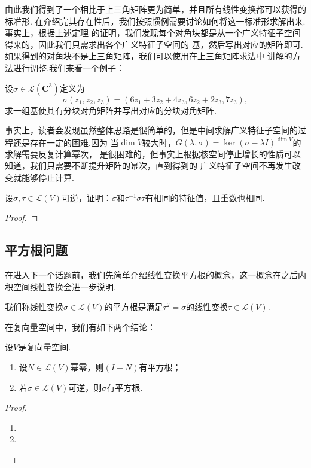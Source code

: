 由此我们得到了一个相比于上三角矩阵更为简单，并且所有线性变换都可以获得的标准形.
在介绍完其存在性后，我们按照惯例需要讨论如何将这一标准形求解出来.事实上，根据上述定理
的证明，我们发现每个对角块都是从一个广义特征子空间得来的，因此我们只需求出各个广义特征子空间的
基，然后写出对应的矩阵即可.如果得到的对角块不是上三角矩阵，我们可以使用在上三角矩阵求法中
讲解的方法进行调整.我们来看一个例子：
\begin{example}
    设$\sigma\in \mathcal{L}(\mathbf{C}^3)$定义为
    \[\sigma(z_1,z_2,z_3)=(6z_1+3z_2+4z_3,6z_2+2z_3,7z_3),\]求一组基使其有分块对角矩阵并写出对应的分块对角矩阵.
\end{example}
\begin{solution}

\end{solution}

事实上，读者会发现虽然整体思路是很简单的，但是中间求解广义特征子空间的过程还是存在一定的困难.因为
当$\dim V$较大时，$G(\lambda,\sigma)=\ker (\sigma-\lambda I)^{\dim V}$的求解需要反复计算幂次，
是很困难的，但事实上根据核空间停止增长的性质可以知道，我们只需要不断提升矩阵的幂次，直到得到的
广义特征子空间不再发生改变就能够停止计算.

\begin{example}
    设$\sigma,\tau\in \mathcal{L}(V)$可逆，证明：$\sigma$和$\tau^{-1}\sigma\tau$有相同的特征值，且重数也相同.
\end{example}
\begin{proof}
    
\end{proof}

\subsection{平方根问题}
在进入下一个话题前，我们先简单介绍线性变换平方根的概念，这一概念在之后内积空间线性变换会进一步说明.
\begin{definition}
    我们称线性变换$\sigma\in \mathcal{L}(V)$的平方根是满足$\tau^2=\sigma$的线性变换$\tau\in \mathcal{L}(V)$.
\end{definition}
在复向量空间中，我们有如下两个结论：
\begin{theorem} \label{thm:20:幂零平方根}
    设$V$是复向量空间.
    \begin{enumerate}[label=(\arabic*)]
        \item 设$N\in \mathcal{L}(V)$幂零，则$(I+N)$有平方根；
        \item 若$\sigma\in \mathcal{L}(V)$可逆，则$\sigma$有平方根.
    \end{enumerate}
\end{theorem}
\begin{proof}
    \begin{enumerate}[label=(\arabic*)]
        \item 
        \item 
    \end{enumerate}
\end{proof}

